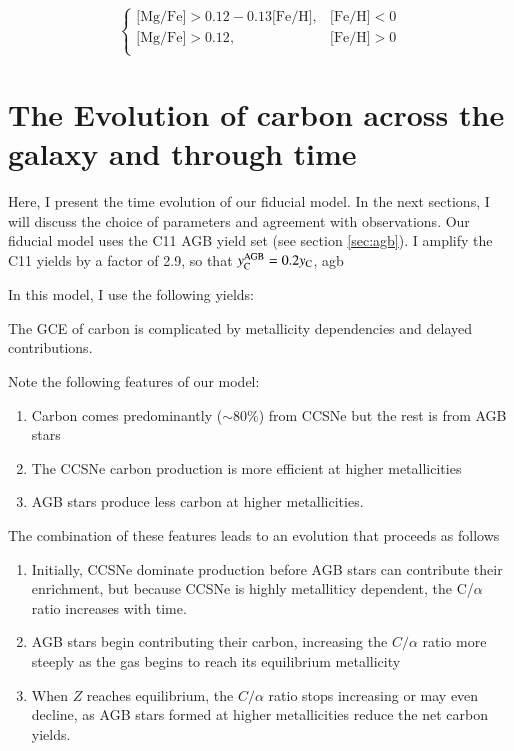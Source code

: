 \documentclass[12pt,oneside]{report}
\newcommand{\Ycagb}{\ensuremath{y_{\rm C}^{\rm AGB}}}
\begin{document}
\begin{equation}\label{eq:high_alpha}
\begin{cases}
\text{[Mg/Fe]} >0.12-0.13\text{[Fe/H]}, & \text{[Fe/H]}<0\\
\text{[Mg/Fe]} >0.12, & \text{[Fe/H]}>0\\
\end{cases}
\end{equation}




\section{The Evolution of carbon across the galaxy and through time}


Here, I present the time evolution of our fiducial model. In the next sections, I will discuss the choice of parameters and agreement with observations. Our fiducial model uses the C11 AGB yield set (see section \ref{sec:agb}). I amplify the C11 yields by a factor of 2.9, so that $\Ycagb = 0.2y_{\rm C}$, agb

In this model, I use the following yields:

The GCE of carbon is complicated by metallicity dependencies and delayed contributions. 

Note the following features of our model:

\begin{enumerate}
    \item Carbon comes predominantly ($\sim80\%$) from CCSNe but the rest is from AGB stars
    \item The CCSNe carbon production is more efficient at higher metallicities
    \item AGB stars produce less carbon at higher metallicities.
\end{enumerate}


The combination of these features leads to an evolution that proceeds as follows
\begin{enumerate}
    \item Initially, CCSNe dominate production before AGB stars can contribute their enrichment, but because CCSNe is highly metalliticy dependent, the C/$\alpha$ ratio increases with time.
    \item AGB stars begin contributing their carbon, increasing the $C/\alpha$ ratio more steeply as the gas begins to reach its equilibrium metallicity
    \item When $Z$ reaches equilibrium, the $C/\alpha$ ratio stops increasing or may even decline, as AGB stars formed at higher metallicities reduce the net carbon yields.
\end{enumerate}
\end{document}

